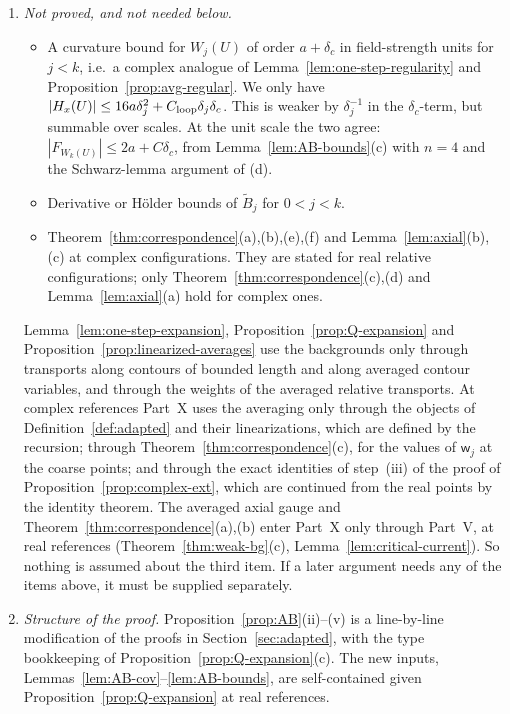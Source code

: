 \begin{remark}\label{rem:AB-remains}
\begin{enumerate}[label=(\arabic*)]
\item \emph{Not proved, and not needed below.}
  \begin{itemize}
  \item A curvature bound for $W_j(U)$ of order $a+\delta_c$ in field-strength units for $j<k$, i.e.\ a complex analogue of Lemma~\ref{lem:one-step-regularity} and Proposition~\ref{prop:avg-regular}. We only have $|H_x(U)|\le16a\delta_j^2+C_{\rm loop}\delta_j\delta_c$. This is weaker by $\delta_j^{-1}$ in the $\delta_c$-term, but summable over scales. At the unit scale the two agree: $|F_{W_k(U)}|\le2a+C\delta_c$, from Lemma~\ref{lem:AB-bounds}(c) with $n=4$ and the Schwarz-lemma argument of (d).
  \item Derivative or H\"older bounds of $\tilde B_j$ for $0<j<k$.
  \item Theorem~\ref{thm:correspondence}(a),(b),(e),(f) and Lemma~\ref{lem:axial}(b),(c) at complex configurations. They are stated for real relative configurations; only Theorem~\ref{thm:correspondence}(c),(d) and Lemma~\ref{lem:axial}(a) hold for complex ones.
  \end{itemize}
  Lemma~\ref{lem:one-step-expansion}, Proposition~\ref{prop:Q-expansion} and Proposition~\ref{prop:linearized-averages} use the backgrounds only through transports along contours of bounded length and along averaged contour variables, and through the weights of the averaged relative transports. At complex references Part~X uses the averaging only through the objects of Definition~\ref{def:adapted} and their linearizations, which are defined by the recursion; through Theorem~\ref{thm:correspondence}(c), for the values of $\mathsf w_j$ at the coarse points; and through the exact identities of step~(iii) of the proof of Proposition~\ref{prop:complex-ext}, which are continued from the real points by the identity theorem. The averaged axial gauge and Theorem~\ref{thm:correspondence}(a),(b) enter Part~X only through Part~V, at real references (Theorem~\ref{thm:weak-bg}(c), Lemma~\ref{lem:critical-current}). So nothing is assumed about the third item. If a later argument needs any of the items above, it must be supplied separately.
\item \emph{Structure of the proof.} Proposition~\ref{prop:AB}(ii)--(v) is a line-by-line modification of the proofs in Section~\ref{sec:adapted}, with the type bookkeeping of Proposition~\ref{prop:Q-expansion}(c). The new inputs, Lemmas~\ref{lem:AB-cov}--\ref{lem:AB-bounds}, are self-contained given Proposition~\ref{prop:Q-expansion} at real references.

\end{enumerate}
\end{remark}
